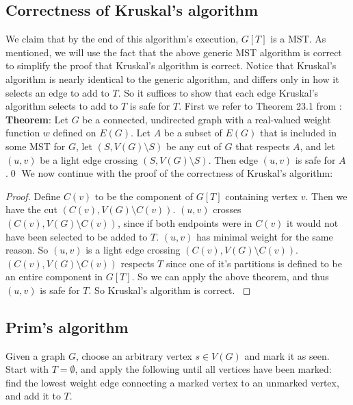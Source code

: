 \documentclass[11pt]{article}
\begin{document}
\subsection{Correctness of Kruskal's algorithm}

We claim that by the end of this algorithm's execution, $G[T]$ is a MST.
As mentioned, we will use the fact that the above generic MST algorithm is correct to simplify the proof that Kruskal's algorithm is correct.
Notice that Kruskal's algorithm is nearly identical to the generic algorithm, and differs only in how it selects an edge to add to $T$.
So it suffices to show that each edge Kruskal's algorithm selects to add to $T$ is safe for $T$.
First we refer to Theorem 23.1 from \cite{CLRS}:
\newline
\newline
\textbf{Theorem}: Let $G$ be a connected, undirected graph with a real-valued weight function $w$ defined on $E(G)$.
Let $A$ be a subset of $E(G)$ that is included in some MST for $G$, let $(S,V(G)\setminus S)$ be any cut of $G$ that respects $A$, and let $(u,v)$ be a light edge crossing $(S,V(G)\setminus S)$.
Then edge $(u,v)$ is safe for $A$.\qed
\newline
\newline
We now continue with the proof of the correctness of Kruskal's algorithm:
\begin{proof}
	Define $C(v)$ to be the component of $G[T]$ containing vertex $v$.
	Then we have the cut $(C(v),V(G)\setminus C(v))$.
	$(u,v)$ crosses $(C(v),V(G)\setminus C(v))$, since if both endpoints were in $C(v)$ it would not have been selected to be added to $T$.
	$(u,v)$ has minimal weight for the same reason.
	So $(u,v)$ is a light edge crossing $(C(v),V(G)\setminus C(v))$.
	$(C(v),V(G)\setminus C(v))$ respects $T$ since one of it's partitions is defined to be an entire component in $G[T]$.
	So we can apply the above theorem, and thus $(u,v)$ is safe for $T$.
	So Kruskal's algorithm is correct. \cite{CLRS}
\end{proof}


\subsection{Prim's algorithm}

Given a graph $G$, choose an arbitrary vertex $s\in V(G)$ and mark it as seen.
Start with $T=\emptyset$, and apply the following until all vertices have been marked: find the lowest weight edge connecting a marked vertex to an unmarked vertex, and add it to $T$. \cite{MST}
\end{document}
